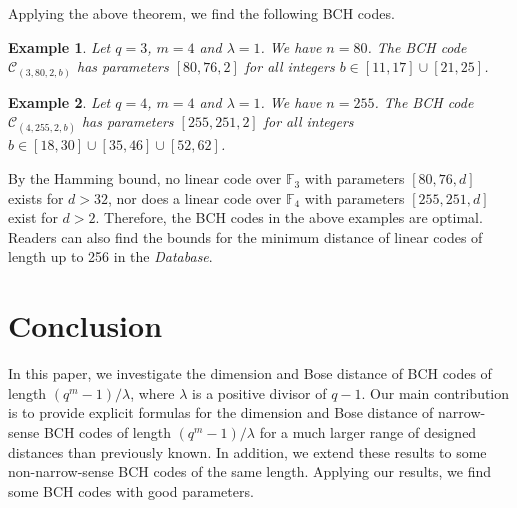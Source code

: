 \documentclass[journal,onecolumn]{IEEEtran}
\newtheorem{example}{Example}
\begin{document}
Applying the above theorem, we find the following   BCH codes. 
\begin{example}
Let $q=3$, $m=4$ and $\lambda=1$. We have $n=80$.  The BCH code 
$\mathcal{C}_{(3,80,2,b)}$ has parameters $[80,76,2]$ for all integers $ b\in [11,17]\cup [21,25]$. 
\end{example}
\begin{example}
Let $q=4$, $m=4$ and $\lambda=1$. We have $n=255$.  The BCH code 
$\mathcal{C}_{(4,255,2,b)}$ has parameters $[255,251,2]$ for all integers $b\in [18, 30]\cup [35,46]\cup[52,62]$. 
\end{example}
By the Hamming bound,  no linear code over $\mathbb{F}_3$
with parameters $[80,76,d]$ exists for $d > 32$, nor does a linear code over
$\mathbb{F}_4$ with parameters $[255,251,d]$ exist for $d > 2$.
Therefore,  the BCH   codes in the above examples are optimal. Readers can also find the bounds for the minimum distance of  linear codes of length up to 256 in the \textit{Database}. 


\section{Conclusion}\label{conclusion}
In this paper, we investigate the dimension and Bose distance of  BCH codes of length $(q^m-1)/\lambda$, where $\lambda$ is a positive divisor of $q-1$. Our main contribution is to provide explicit formulas for the dimension and   Bose distance of narrow-sense BCH codes of length $(q^m-1)/\lambda$
  for a much larger range of designed distances than previously known.  In addition, we 
 extend these results to some non-narrow-sense BCH codes of the same length. Applying our results, we find some BCH codes with good parameters. 















\appendices
\end{document}
